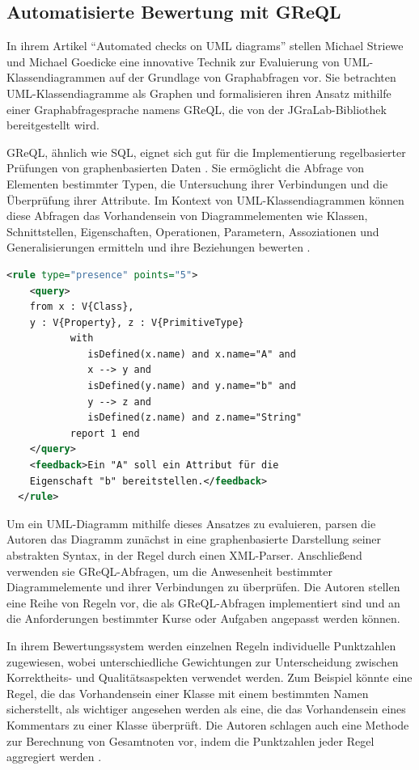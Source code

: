 \subsection{Automatisierte Bewertung mit GReQL}

In ihrem Artikel ``Automated checks on UML diagrams'' \cite{striewe2011automated} stellen Michael Striewe und Michael Goedicke eine innovative Technik zur Evaluierung von UML-Klassendiagrammen auf der Grundlage von Graphabfragen vor. Sie betrachten UML-Klassendiagramme als Graphen und formalisieren ihren Ansatz mithilfe einer Graphabfragesprache namens GReQL, die von der JGraLab-Bibliothek bereitgestellt wird.

\ac{GReQL}, ähnlich wie SQL, eignet sich gut für die Implementierung regelbasierter Prüfungen von graphenbasierten Daten \cite{striewe2014automated}. Sie ermöglicht die Abfrage von Elementen bestimmter Typen, die Untersuchung ihrer Verbindungen und die Überprüfung ihrer Attribute. Im Kontext von UML-Klassendiagrammen können diese Abfragen das Vorhandensein von Diagrammelementen wie Klassen, Schnittstellen, Eigenschaften, Operationen, Parametern, Assoziationen und Generalisierungen ermitteln und ihre Beziehungen bewerten \cite{striewe2011automated}.

\begin{lstlisting}[caption={[Codebeispiel] Codebeispiel in GReQL}, label={lst:greql}, float=!ht, language=xml]
  <rule type="presence" points="5">
    <query>
    from x : V{Class},
    y : V{Property}, z : V{PrimitiveType}
           with
              isDefined(x.name) and x.name="A" and
              x --> y and
              isDefined(y.name) and y.name="b" and
              y --> z and
              isDefined(z.name) and z.name="String"
           report 1 end
    </query>
    <feedback>Ein "A" soll ein Attribut für die
    Eigenschaft "b" bereitstellen.</feedback>
  </rule>
\end{lstlisting}

Um ein UML-Diagramm mithilfe dieses Ansatzes zu evaluieren, parsen die Autoren das Diagramm zunächst in eine graphenbasierte Darstellung seiner abstrakten Syntax, in der Regel durch einen XML-Parser. Anschließend verwenden sie \ac{GReQL}-Abfragen, um die Anwesenheit bestimmter Diagrammelemente und ihrer Verbindungen zu überprüfen. Die Autoren stellen eine Reihe von Regeln vor, die als \ac{GReQL}-Abfragen implementiert sind und an die Anforderungen bestimmter Kurse oder Aufgaben angepasst werden können.

In ihrem Bewertungssystem werden einzelnen Regeln individuelle Punktzahlen zugewiesen, wobei unterschiedliche Gewichtungen zur Unterscheidung zwischen Korrektheits- und Qualitätsaspekten verwendet werden. Zum Beispiel könnte eine Regel, die das Vorhandensein einer Klasse mit einem bestimmten Namen sicherstellt, als wichtiger angesehen werden als eine, die das Vorhandensein eines Kommentars zu einer Klasse überprüft. Die Autoren schlagen auch eine Methode zur Berechnung von Gesamtnoten vor, indem die Punktzahlen jeder Regel aggregiert werden \cite{striewe2011automated}.


